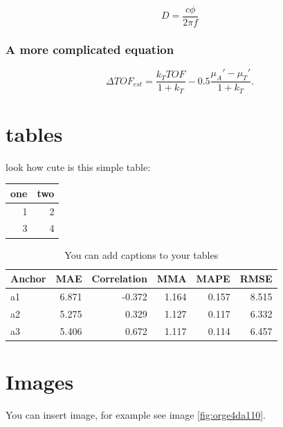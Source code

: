 \begin{equation}
\label{eq:org20056c2}
D = \frac{c\phi}{2\pi f}
\end{equation}

\subsubsection{A more complicated equation}
\label{sec:org032a3a9}

\begin{equation}
\Delta TOF_{est} = \frac{k_T TOF}{1+k_T } - 0.5 \frac{\mu_A' - \mu_T'}{1+k_T}.
\end{equation}

\section{tables}
\label{sec:orgd050fbb}

look how cute is this simple table:

\begin{center}
\begin{tabular}{rr}
one & two\\
\hline
1 & 2\\
3 & 4\\
\end{tabular}
\end{center}

\begin{table}[htbp]
\caption{\label{tab:orgbc7aa3e}
You can add captions to your tables}
\centering
\begin{tabular}{lrrrrr}
Anchor & MAE & Correlation & MMA & MAPE & RMSE\\
\hline
a1 & 6.871 & -0.372 & 1.164 & 0.157 & 8.515\\
a2 & 5.275 & 0.329 & 1.127 & 0.117 & 6.332\\
a3 & 5.406 & 0.672 & 1.117 & 0.114 & 6.457\\
\end{tabular}
\end{table}

\section{Images}
\label{sec:orgdc1b3b9}
You can insert image, for example see image \ref{fig:orge4da110}.

